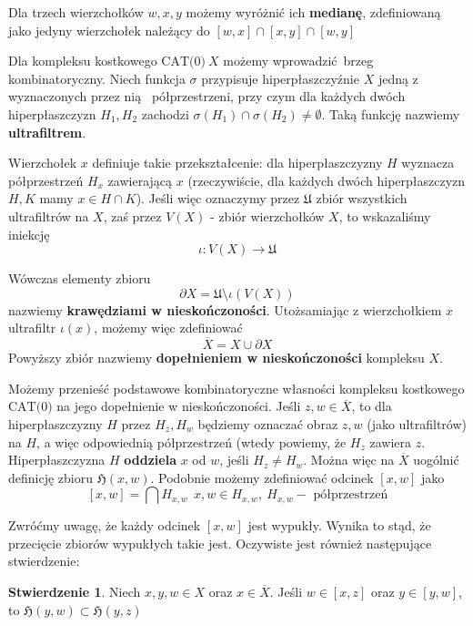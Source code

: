 \documentclass[licencjacka]{pracamgr}
\theoremstyle{definition}
\theoremstyle{definition}
\theoremstyle{definition}
\newtheorem{proposition}{Stwierdzenie}[section]
\theoremstyle{definition}
\theoremstyle{definition}
\theoremstyle{plain}
\theoremstyle{plain}
\begin{document}
Dla trzech wierzchołków $ w,x,y $ możemy wyróżnić ich \textbf{medianę}, zdefiniowaną 
jako jedyny wierzchołek należący do $ [w,x] \cap [x,y] \cap [w,y] $

Dla kompleksu kostkowego $ \text{CAT(0)}~ X$ możemy wprowadzić brzeg kombinatoryczny. 
Niech funkcja $ \sigma $ przypisuje hiperpłaszczyźnie $ X $ jedną z wyznaczonych przez nią 
półprzestrzeni, przy czym dla każdych dwóch hiperpłaszczyzn $ H_1, H_2 $ zachodzi 
$ \sigma(H_1) \cap \sigma(H_2) \neq \emptyset $. Taką funkcję nazwiemy \textbf{ultrafiltrem}.

Wierzchołek $ x $ definiuje takie przekształcenie: dla hiperpłaszczyzny $ H $ wyznacza 
półprzestrzeń $ H_x $ zawierającą $ x $ (rzeczywiście, dla każdych dwóch hiperpłaszczyzn 
$ H,K $ mamy $ x \in H \cap K $). Jeśli więc oznaczymy przez $\mathfrak{U}$ zbiór wszystkich 
ultrafiltrów na $ X $, zaś przez $ V (X) $ - zbiór wierzchołków $ X $, to wskazaliśmy iniekcję 
$$ \iota : V(X) \rightarrow \mathfrak{U} $$

Wówczas elementy zbioru $$ \partial X = \mathfrak{U} \setminus \iota(V(X)) $$
nazwiemy \textbf{krawędziami w nieskończoności}. Utożsamiając z wierzchołkiem $ x $ 
ultrafiltr $ \iota(x) $, możemy więc zdefiniować
$$ \overline{X} = X \cup \partial X $$
Powyższy zbiór nazwiemy \textbf{dopełnieniem w nieskończoności} kompleksu $ X $.

Możemy przenieść podstawowe kombinatoryczne własności 
kompleksu kostkowego $ \text{CAT(0)}$ 
na jego dopełnienie w nieskończoności. Jeśli $ z,w \in \overline{X} $, to dla 
hiperpłaszczyzny $ H $ przez $ H_z, H_w $ będziemy oznaczać obraz $ z,w $ 
(jako ultrafiltrów) na 
$ H $, a więc odpowiednią półprzestrzeń (wtedy powiemy, że $ H_z $ zawiera $ z $. 
Hiperpłaszczyzna $ H $ \textbf{oddziela} $ x $ od $ w $, 
jeśli $ H_z \neq H_w $. Można więc na $ \overline{X} $ uogólnić definicję zbioru 
$ \mathfrak{H}(x,w)$. Podobnie możemy zdefiniować odcinek $ [x,w] $ jako 
$$ [x,w] = \bigcap H_{x,w}  ~~ x,w \in H_{x,w}, ~ H_{x,w} - \text{ półprzestrzeń}$$

Zwróćmy uwagę, że każdy odcinek $ [x,w] $ jest wypukły. Wynika to stąd, że przecięcie 
zbiorów wypukłych takie jest. Oczywiste jest również następujące stwierdzenie: 

\begin{proposition}
	Niech $ x,y,w \in X $ oraz $ x \in \overline{X} $. Jeśli $ w \in [x,z] $ oraz 
	$ y \in [y,w] $, to $ \mathfrak{H}(y,w) \subset \mathfrak{H}(y,z)$
\end{proposition}
\end{document}
